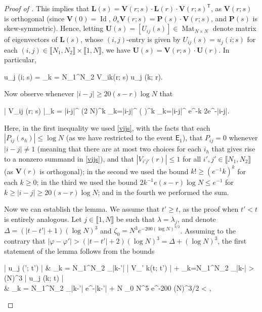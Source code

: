 \documentclass{amsart}
\numberwithin{equation}{section}
\DeclareMathOperator{\Id}{Id}
\DeclareMathOperator{\Mat}{Mat}
\theoremstyle{remark}
\theoremstyle{definition}
\begin{document}
\begin{proof}[Proof of ]
		This implies that $\bm{L}(s) = \bm{V}(r; s) \cdot \bm{L}(r) \cdot \bm{V}(r; s)^{\mathsf{T}}$, as $\bm{V}(r; s)$ is orthogonal (since $\bm{V}(0) = \Id$, $\partial_s \bm{V}(r; s) = \bm{P}(s) \cdot \bm{V}(r; s)$, and $\bm{P}(s)$ is skew-symmetric). Hence, letting $\bm{U}(s) = [ U_{ij} (s) ] \in \Mat_{N \times N}$ denote matrix of eigenvectors of $\bm{L}(s)$, whose $(i,j)$-entry is given by $U_{ij}(s) = u_j (i; s)$ for each $(i, j) \in \llbracket N_1, N_2 \rrbracket \times \llbracket 1, N \rrbracket$, we have $\bm{U}(s) = \bm{V}(r; s) \cdot \bm{U}(r)$. In particular,
		\begin{flalign}
			\label{vijsu0} 
			u_j (i; s) = \displaystyle\sum_{k = N_1}^{N_2} V_{ik}(r; s) \cdot u_j (k; r).
		\end{flalign}
		
		Now observe whenever $|i-j| \ge 20 (s-r) \log N$ that 
		\begin{flalign}
			\label{u0vijs}
			| V_{ij} (r; s) |\le \displaystyle\sum_{k = |i-j|}^{\infty} \displaystyle{} \cdot (2 \log N)^k \le \displaystyle\sum_{k=|i-j|}^{\infty} \bigg( \displaystyle{} \bigg)^k \le \displaystyle\sum_{k=|i-j|}^{\infty} e^{-k} \le 2e^{-|i-j|}.
		\end{flalign}
		
		\noindent Here, in the first inequality we used \eqref{vijs}, with the facts that each $| P_{ij} (s_h) | \le \log N$ (as we have restricted to the event $\mathsf{E}_1$), that $P_{ij} = 0$ whenever $|i-j| \ne 1$ (meaning that there are at most two choices for each $i_h$ that gives rise to a nonzero summand in \eqref{vijs}), and that $|V_{i'j'} (r)| \le 1$ for all $i',j' \in \llbracket N_1, N_2 \rrbracket$ (as $\bm{V}(r)$ is orthogonal); in the second we used the bound $k! \ge (e^{-1} k)^k$ for each $k \ge 0$; in the third we used the bound $2k^{-1} e(s-r) \log N \le e^{-1}$ for $k \ge |i-j| \ge 20 (s-r) \log N$; and in the fourth we performed the sum. 
		
		Now we can establish the lemma. We assume that $t' \ge t$, as the proof when $t' < t$ is entirely analogous. Let $j \in \llbracket 1, N \rrbracket$ be such that $\lambda = \lambda_j$, and denote $\Delta = (|t-t'| + 1) (\log N)^3$ and $\zeta_0 = N^3 e^{-200 (\log N)^{3/2}}$. Assuming to the contrary that $|\varphi - \varphi'| > (|t-t'|+2) (\log N)^3 = \Delta + (\log N)^3$, the first statement of the lemma follows from the bounds 
		\begin{flalign*}
			| u_j (\varphi'; t') | & \le \displaystyle\sum_{k = N_1}^{N_2} _{|k-\varphi'| \ge \Delta} \cdot | V_{\varphi' k}(t; t') | + \displaystyle\sum_{k=N_1}^{N_2} _{|k-\varphi| > (\log N)^3} \cdot | u_j (k; t) | \\
			&  \displaystyle\sum_{k = N_1}^{N_2} _{|k-\varphi'| \ge \Delta} \cdot e^{-|k-\varphi'|} + N \zeta_0 \le N^5 e^{-200 (\log N)^{3/2}} < \zeta,
		\end{flalign*}
		

\end{proof}
\end{document}
